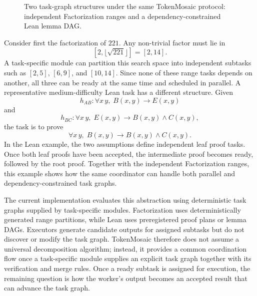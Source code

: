 \documentclass{article}
\theoremstyle{plain}
\begin{document}
\begin{figure}[!h]
{%
}



\caption{
Two task-graph structures under the same TokenMosaic protocol: independent Factorization ranges and a dependency-constrained Lean lemma DAG.
}
\label{fig:task-graph-examples-balanced}
\end{figure}

Consider first the factorization of $221$. Any non-trivial factor must lie in
\[
[2,\lfloor\sqrt{221}\rfloor]=[2,14].
\]
A task-specific module can partition this search space into independent subtasks such as $[2,5]$, $[6,9]$, and $[10,14]$. Since none of these range tasks depends on another, all three can be ready at the same time and scheduled in parallel. A representative medium-difficulty Lean task has a different structure. Given
\[
h_{AB}:\forall x\,y,\;B(x,y)\rightarrow E(x,y)
\]
and
\[
h_{BC}:\forall x\,y,\;E(x,y)\rightarrow B(x,y)\land C(x,y),
\]
the task is to prove
\[
\forall x\,y,\;B(x,y)\rightarrow B(x,y)\land C(x,y).
\]
In the Lean example, the two assumptions define independent leaf proof tasks. Once both leaf proofs have been accepted, the intermediate proof becomes ready, followed by the root proof. Together with the independent Factorization ranges, this example shows how the same coordinator can handle both parallel and dependency-constrained task graphs.

The current implementation evaluates this abstraction using deterministic task graphs supplied by task-specific modules. Factorization uses deterministically generated range partitions, while Lean uses preregistered proof plans or lemma DAGs. Executors generate candidate outputs for assigned subtasks but do not discover or modify the task graph. TokenMosaic therefore does not assume a universal decomposition algorithm; instead, it provides a common coordination flow once a task-specific module supplies an explicit task graph together with its verification and merge rules. Once a ready subtask is assigned for execution, the remaining question is how the worker's output becomes an accepted result that can advance the task graph.
\end{document}
